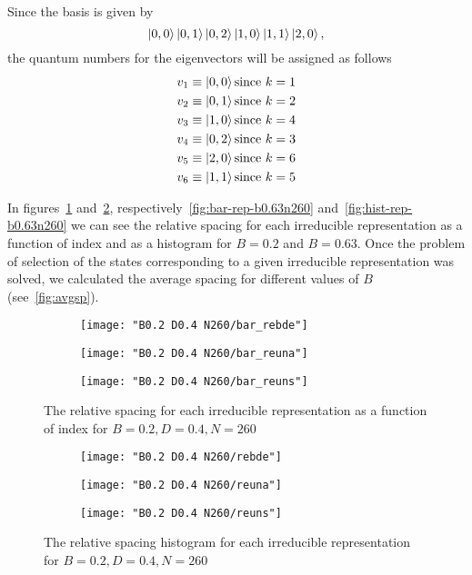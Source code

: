 \documentclass[../thesis.tex]{subfiles}
\begin{document}
Since the basis is given by
\[
  \ket{0, 0} \ket{0, 1} \ket{0, 2} \ket{1, 0} \ket{1, 1} \ket{2, 0},
\]
the quantum numbers for the eigenvectors will be assigned as follows
\begin{align*}
  v_1 &\equiv \ket{0, 0} \text{since}\ k = 1 \\
  v_2 &\equiv \ket{0, 1} \text{since}\ k = 2 \\
  v_3 &\equiv \ket{1, 0} \text{since}\ k = 4 \\
  v_4 &\equiv \ket{0, 2} \text{since}\ k = 3 \\
  v_5 &\equiv \ket{2, 0} \text{since}\ k = 6 \\
  v_6 &\equiv \ket{1, 1} \text{since}\ k = 5
\end{align*}


In figures~\ref{fig:bar-rep-b0.2n120} and~\ref{fig:hist-rep-b0.2n120},
respectively~\ref{fig:bar-rep-b0.63n260} and~\ref{fig:hist-rep-b0.63n260}
we can see the relative spacing for each irreducible representation as a function
of index and as a histogram for \(B=0.2\) and \(B=0.63\).
Once the problem of selection of the states corresponding to a given
irreducible representation was solved, we calculated the average spacing for
different values of $B$ (see~\cref{fig:avgsp}).

\begin{figure}[h]
  \centering
  \begin{subfigure}[b]{0.49\textwidth}
    \centering
    \texttt{[image: "B0.2 D0.4 N260/bar\_rebde"]}
  \end{subfigure}
  \begin{subfigure}[b]{0.49\textwidth}
    \centering
    \texttt{[image: "B0.2 D0.4 N260/bar\_reuna"]}
  \end{subfigure}
  \begin{subfigure}[b]{0.49\textwidth}
    \centering
    \texttt{[image: "B0.2 D0.4 N260/bar\_reuns"]}
  \end{subfigure}
  \caption{The relative spacing for each irreducible representation as a function
  of index for \(B=0.2, D=0.4, N=260\)}
  \label{fig:bar-rep-b0.2n120}  %
\end{figure}

\begin{figure}
  \centering
  \begin{subfigure}[b]{0.49\textwidth}
    \centering
    \texttt{[image: "B0.2 D0.4 N260/rebde"]}
  \end{subfigure}
  \begin{subfigure}[b]{0.49\textwidth}
    \centering
    \texttt{[image: "B0.2 D0.4 N260/reuna"]}
  \end{subfigure}
  \begin{subfigure}[b]{0.49\textwidth}
    \centering
    \texttt{[image: "B0.2 D0.4 N260/reuns"]}
  \end{subfigure}
  \caption{The relative spacing histogram for each irreducible representation for
  \(B=0.2, D=0.4, N=260\)}
\label{fig:hist-rep-b0.2n120}
\end{figure}
\end{document}
